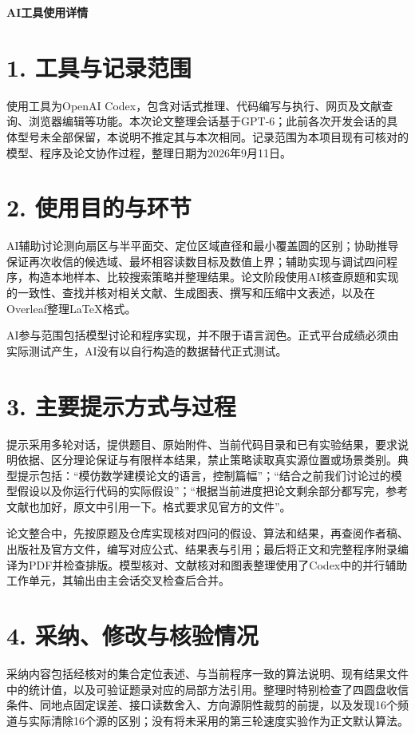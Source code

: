 \documentclass[a4paper,UTF8,zihao=-4,fontset=none]{ctexart}
\begin{document}
\begin{center}\Large\bfseries AI工具使用详情\end{center}
\section*{1. 工具与记录范围}
使用工具为OpenAI Codex，包含对话式推理、代码编写与执行、网页及文献查询、浏览器编辑等功能。本次论文整理会话基于GPT-6；此前各次开发会话的具体型号未全部保留，本说明不推定其与本次相同。记录范围为本项目现有可核对的模型、程序及论文协作过程，整理日期为2026年9月11日。

\section*{2. 使用目的与环节}
AI辅助讨论测向扇区与半平面交、定位区域直径和最小覆盖圆的区别；协助推导保证再次收信的候选域、最坏相容读数目标及数值上界；辅助实现与调试四问程序，构造本地样本、比较搜索策略并整理结果。论文阶段使用AI核查原题和实现的一致性、查找并核对相关文献、生成图表、撰写和压缩中文表述，以及在Overleaf整理LaTeX格式。

AI参与范围包括模型讨论和程序实现，并不限于语言润色。正式平台成绩必须由实际测试产生，AI没有以自行构造的数据替代正式测试。

\section*{3. 主要提示方式与过程}
提示采用多轮对话，提供题目、原始附件、当前代码目录和已有实验结果，要求说明依据、区分理论保证与有限样本结果，禁止策略读取真实源位置或场景类别。典型提示包括：“模仿数学建模论文的语言，控制篇幅”；“结合之前我们讨论过的模型假设以及你运行代码的实际假设”；“根据当前进度把论文剩余部分都写完，参考文献也加好，原文中引用一下。格式要求见官方的文件”。

论文整合中，先按原题及仓库实现核对四问的假设、算法和结果，再查阅作者稿、出版社及官方文件，编写对应公式、结果表与引用；最后将正文和完整程序附录编译为PDF并检查排版。模型核对、文献核对和图表整理使用了Codex中的并行辅助工作单元，其输出由主会话交叉检查后合并。

\section*{4. 采纳、修改与核验情况}
采纳内容包括经核对的集合定位表述、与当前程序一致的算法说明、现有结果文件中的统计值，以及可验证题录对应的局部方法引用。整理时特别检查了四圆盘收信条件、同地点固定误差、接口读数舍入、方向源阴性裁剪的前提，以及发现16个频道与实际清除16个源的区别；没有将未采用的第三轮速度实验作为正文默认算法。
\end{document}
